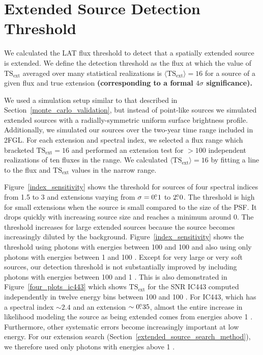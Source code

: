 \documentclass[12pt,preprint]{aastex}
\newcommand{\mev}{\text{MeV}\xspace}
\newcommand{\gev}{\text{GeV}\xspace}
\newcommand{\tsext}{{\ensuremath{\text{TS}_{\text{ext}}}}\xspace}
\newcommand{\newtext}[1]{{\bfseries \color{red}#1}}
\begin{document}
\section{Extended Source Detection Threshold}
\label{extension_sensitivity}

We calculated the LAT flux threshold to detect that a spatially extended
source is extended. We define the detection threshold as the flux at
which the value of $\tsext$ averaged over many statistical realizations is
$\langle\tsext\rangle=16$ for a source of a given flux and true extension
\newtext{
(corresponding to a formal $4\sigma$ significance).
}

We used a simulation setup similar to that described in
Section~\ref{monte_carlo_validation}, but instead of point-like sources
we simulated extended sources with a radially-symmetric uniform surface
brightness profile. Additionally, we simulated our sources over the two-year
time range included in 2FGL.  For each extension and spectral index,
we selected a flux range which bracketed $\tsext=16$ and performed an
extension test for $>100$ independent realizations of ten fluxes in
the range.  We calculated $\langle\tsext\rangle=16$ by fitting a line
to the flux and $\tsext$ values in the narrow range.

Figure~\ref{index_sensitivity} shows the threshold for sources of four
spectral indices from 1.5 to 3 and extensions varying from $\sigma=0\mbox{$.\!\!^\circ$}1$
to $2\mbox{$.\!\!^\circ$}0$.  
The threshold is high for small extensions when the
source is 
small compared to the size of the PSF. 
It drops quickly with increasing source size and reaches
a minimum around 0. 
The threshold increases
for large extended sources because the source becomes
increasingly diluted by the background.
Figure~\ref{index_sensitivity} shows
the threshold using photons with energies between 100 \mev and 100 \gev
and also using only photons with energies between 1 \gev and 100 \gev.
Except for very large or very soft
sources, our detection threshold is
not substantially improved by including photons with energies between 100 \mev and
1 \gev.  This is also demonstrated in Figure~\ref{four_plots_ic443}
which shows \tsext for the SNR IC443 computed independently in twelve
energy bins between 100 \mev and 100 \gev. For IC443, which has a
spectral index $\sim2.4$ and an extension $\sim0\mbox{$.\!\!^\circ$}35$, 
almost the entire increase in likelihood
modeling the source as being extended comes
from energies above 1 \gev.  Furthermore, other systematic errors
become increasingly important at low energy. For our extension search
(Section~\ref{extended_source_search_method}),
we therefore used only photons with energies above 1 \gev.
\end{document}

